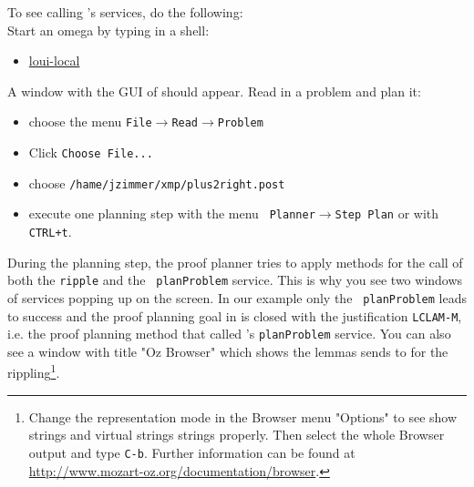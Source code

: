 To see {\OMEGA} calling {\lclam}'s services, do the following:\\
Start an omega by typing in a shell:
\begin{itemize}
\item \url{loui-local}
\end{itemize}
A window with the GUI of {\OMEGA} should appear. Read in a problem and plan it:
\begin{itemize}
\item choose the menu  {\tt File}$\rightarrow${\tt Read}$\rightarrow${\tt Problem}
\item Click {\tt Choose File...}
\item choose {\tt /hame/jzimmer/xmp/plus2right.post}
\item execute one planning step with the menu {\tt
    Planner}$\rightarrow${\tt Step Plan} or with {\tt CTRL+t}.
\end{itemize}
During the planning step, the {\OMEGA} proof planner tries to apply
methods for the call of both the {\tt ripple} and the {\tt
  planProblem} service. This is why you see two windows of {\lclam}
services popping up on the screen. In our example only the {\tt
  planProblem} leads to success and the proof planning goal in
{\OMEGA} is closed with the justification {\tt LCLAM-M}, i.e. the
proof planning method that called {\lclam}'s {\tt planProblem}
service. You can also see a window with title "Oz Browser" which shows
the lemmas {\OMEGA} sends to {\lclam} for the rippling\footnote{Change
  the representation mode in the Browser menu "Options" to see show
  strings and virtual strings strings properly. Then select the whole
  Browser output and type {\tt C-b}. Further information can be found
  at \url{http://www.mozart-oz.org/documentation/browser}.}.



